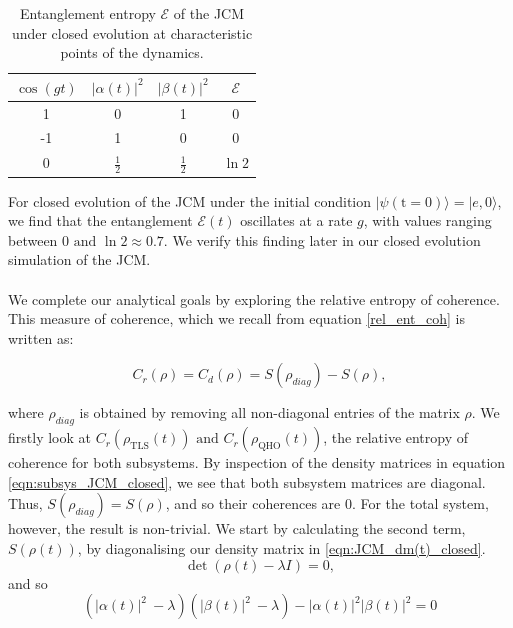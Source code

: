 \documentclass[11pt]{article}
\begin{document}
\begin{table}[H]
    \centering
    \begin{tabular}{c|c|c|c}
        \toprule
        $\cos(gt)$ & $|\alpha(t)|^2$ & $|\beta(t)|^2$ & $\mathcal{E}$ \\
        \midrule
        1   & 0   & 1   & 0 \\
        -1  & 1   & 0   & 0 \\
        0   & $\tfrac{1}{2}$ & $\tfrac{1}{2}$ & $\ln 2$ \\
        \bottomrule
    \end{tabular}
    \caption{Entanglement entropy $\mathcal{E}$ of the JCM under closed evolution at characteristic points of the dynamics.}
    \label{tab:vne_JCM_closed}
\end{table}

For closed evolution of the JCM under the initial condition $|\psi(\text{t} = 0)\rangle = |e,0\rangle$, we find that the entanglement $\mathcal{E}(t)$ oscillates at a rate $g$, with values ranging between $0 \text{ and } \ln2 \approx 0.7$. We verify this finding later in our closed evolution simulation of the JCM.\\
\\
We complete our analytical goals by exploring the relative entropy of coherence. This measure of coherence, which we recall from equation \eqref{rel_ent_coh} is written as:

\begin{equation*}
C_r(\rho) = C_d(\rho) = S(\rho_{diag}) - S(\rho),
\end{equation*}

where $\rho_{diag}$ is obtained by removing all non-diagonal entries of the matrix $\rho$. We firstly look at $C_r(\rho_{\scriptscriptstyle \text{TLS}}(t)) \text{ and }  C_r(\rho_{\scriptscriptstyle \text{QHO}}(t))$, the relative entropy of coherence for both subsystems. By inspection of the density matrices in equation \eqref{eqn:subsys_JCM_closed}, we see that both subsystem matrices are diagonal. Thus, $S(\rho_{diag}) = S(\rho)$, and so their coherences are $0$. For the total system, however, the result is non-trivial. We start by calculating the second term, $S(\rho(t))$, by diagonalising our density matrix in \eqref{eqn:JCM_dm(t)_closed}.
\begin{equation*}
    \det(\rho(t) - \lambda I) = 0,
\end{equation*}
and so 
\begin{equation*}
    \left(|\alpha(t)|^2\ - \lambda\right) \left(|\beta(t)|^2\ - \lambda \right) - |\alpha(t)|^2|\beta(t)|^2 =0
\end{equation*}
\end{document}

